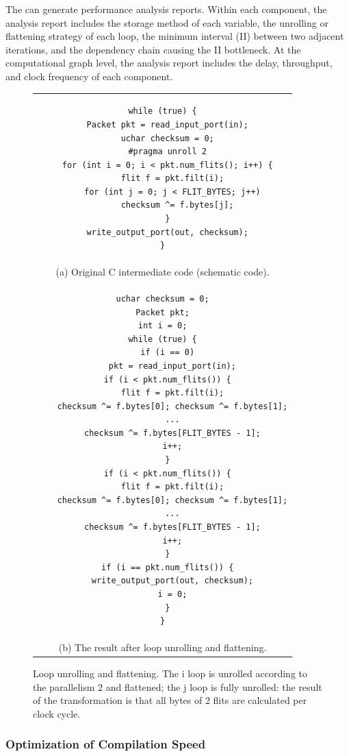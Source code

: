 The \name can generate performance analysis reports. Within each component, the analysis report includes the storage method of each variable, the unrolling or flattening strategy of each loop, the minimum interval (II) between two adjacent iterations, and the dependency chain causing the II bottleneck. At the computational graph level, the analysis report includes the delay, throughput, and clock frequency of each component.

\begin{figure}
	\lstset{style=numbers}
	
	\centering
	\renewcommand{\baselinestretch}{0.75}
	\begin{tabular}{c}
		{
			\small
\begin{lstlisting}[escapechar=@]
while (true) {
  Packet pkt = read_input_port(in);
  uchar checksum = 0;
  #pragma unroll 2
  for (int i = 0; i < pkt.num_flits(); i++) {
    flit f = pkt.filt(i);
    for (int j = 0; j < FLIT_BYTES; j++)
      checksum ^= f.bytes[j];
  }
  write_output_port(out, checksum);
}
\end{lstlisting} 
		} \\
		(a) Original C intermediate code (schematic code).  \\
		{
			\small 
\begin{lstlisting}[escapechar=@]
uchar checksum = 0;
Packet pkt;
int i = 0;
while (true) {
  if (i == 0)
    pkt = read_input_port(in);
  if (i < pkt.num_flits()) {
    flit f = pkt.filt(i);
    checksum ^= f.bytes[0]; checksum ^= f.bytes[1];
    ...
    checksum ^= f.bytes[FLIT_BYTES - 1];
    i++;
  }
  if (i < pkt.num_flits()) {
    flit f = pkt.filt(i);
    checksum ^= f.bytes[0]; checksum ^= f.bytes[1];
    ...
    checksum ^= f.bytes[FLIT_BYTES - 1];
    i++;
  }
  if (i == pkt.num_flits()) {
    write_output_port(out, checksum);
    i = 0;
  }
}
\end{lstlisting} 
		} \\
		(b) The result after loop unrolling and flattening.
	\end{tabular}
	\caption{Loop unrolling and flattening. The i loop is unrolled according to the parallelism 2 and flattened; the j loop is fully unrolled: the result of the transformation is that all bytes of 2 flits are calculated per clock cycle.}
	\label{clicknp:fig:flatten}
\end{figure}

\subsubsection{Optimization of Compilation Speed}

